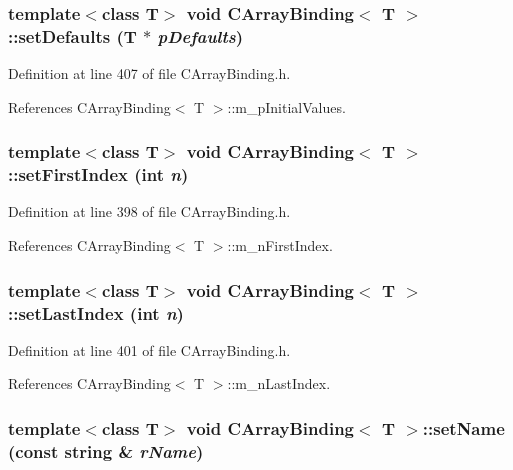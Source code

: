 \subsubsection{\setlength{\rightskip}{0pt plus 5cm}template$<$class T$>$ void CArray\-Binding$<$ T $>$::set\-Defaults (T $\ast$ {\em p\-Defaults})\hspace{0.3cm}{\tt  [inline, protected]}}\label{classCArrayBinding_b5}




Definition at line 407 of file CArray\-Binding.h.

References CArray\-Binding$<$ T $>$::m\_\-p\-Initial\-Values.
\subsubsection{\setlength{\rightskip}{0pt plus 5cm}template$<$class T$>$ void CArray\-Binding$<$ T $>$::set\-First\-Index (int {\em n})\hspace{0.3cm}{\tt  [inline, protected]}}\label{classCArrayBinding_b2}




Definition at line 398 of file CArray\-Binding.h.

References CArray\-Binding$<$ T $>$::m\_\-n\-First\-Index.
\subsubsection{\setlength{\rightskip}{0pt plus 5cm}template$<$class T$>$ void CArray\-Binding$<$ T $>$::set\-Last\-Index (int {\em n})\hspace{0.3cm}{\tt  [inline, protected]}}\label{classCArrayBinding_b3}




Definition at line 401 of file CArray\-Binding.h.

References CArray\-Binding$<$ T $>$::m\_\-n\-Last\-Index.
\subsubsection{\setlength{\rightskip}{0pt plus 5cm}template$<$class T$>$ void CArray\-Binding$<$ T $>$::set\-Name (const string \& {\em r\-Name})\hspace{0.3cm}{\tt  [inline, protected]}}\label{classCArrayBinding_b4}




